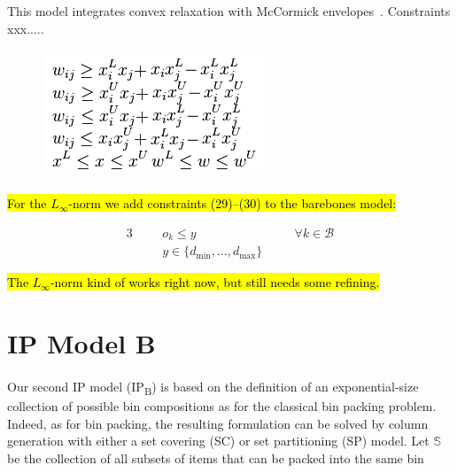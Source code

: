 \documentclass{llncs}
\begin{document}
This model integrates convex relaxation with McCormick envelopes~\cite{Mitsos2009}. Constraints xxx.....

\begin{figure}[H]
  \begin{center}
    \includegraphics[scale=0.6]{env.png}
  \end{center}
\end{figure}

\paragraph{}\hl{For the $L_{\infty}$-norm we add constraints (29)--(30) to the barebones model:}

\begin{alignat}{3}
  &&& o_{k} \leq y && \quad \forall k \in \mathcal{B} \\
  &&& y \in \{d_{\min}, ..., d_{\max}\}
\end{alignat}

\hl{The $L_{\infty}$-norm kind of works right now, but still needs some refining.}






\section{IP Model B}
\label{sec:ip_model_b}

\paragraph{}Our second IP model (IP\textsubscript{B}) is based on the definition of an exponential-size collection of possible bin compositions as for the classical bin packing problem. Indeed, as for bin packing, the resulting formulation can be solved by column generation with either a set covering (SC) or set partitioning (SP) model. Let $\mathbb{S}$ be the collection of all subsets of items that can be packed into the same bin
\end{document}
